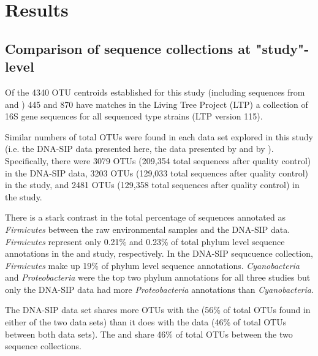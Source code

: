 \section{Results}

\subsection{Comparison of sequence collections at "study"-level}
Of the 4340 OTU centroids established for this study (including sequences from \citet{Steven_2013} and \cite{Garcia_Pichel_2013}) 445 and 870 have matches in the Living Tree Project (LTP) a collection of 16S gene sequences for all sequenced type strains \cite{Yarza_2008} (LTP version 115).

Similar numbers of total OTUs were found in each data set explored in this study (i.e. the DNA-SIP data presented here, the data presented by \citet{Steven_2013} and by \citet{Garcia_Pichel_2013}). Specifically, there were 3079 OTUs (209,354 total sequences after quality control) in the DNA-SIP data, 3203 OTUs (129,033 total sequences after quality control) in the \citet{Garcia_Pichel_2013} study, and 2481 OTUs (129,358 total sequences after quality control) in the \citet{Steven_2013} study.

There is a stark contrast in the total percentage of sequences annotated as \textit{Firmicutes} between the raw environmental samples and the DNA-SIP data. \textit{Firmicutes} represent only 0.21\% and 0.23\% of total phylum level sequence annotations in the \citet{Steven_2013} and \citet{Garcia_Pichel_2013} study, respectively. In the DNA-SIP sequcuence collection, \textit{Firmicutes} make up 19\% of phylum level sequence annotations. \textit{Cyanobacteria} and \textit{Proteobacteria} were the top two phylum annotations for all three studies but only the DNA-SIP data had more \textit{Proteobacteria} annotations than \textit{Cyanobacteria}.

The DNA-SIP data set shares more OTUs with the \citet{Steven_2013} (56\% of total OTUs found in either of the two data sets) than it does with the \citet{Garcia_Pichel_2013} data (46\% of total OTUs between both data sets). The \cite{Steven_2013} and \cite{Garcia_Pichel_2013} share 46\% of total OTUs between the two sequence collections.

